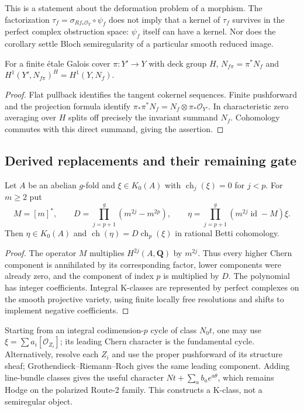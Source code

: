 This is a statement about the deformation problem of a morphism.
The factorization
$\tau_f=\sigma_{Rf_*\mathcal O_Y}\circ\psi_f$
does not imply that a kernel of $\tau_f$ survives in the perfect
complex obstruction space: $\psi_f$ itself can have a kernel.
Nor does the corollary settle Bloch semiregularity of a particular
smooth reduced image.

\begin{proposition}
\label{prop:semireg-cover-invariants}
For a finite \'etale Galois cover $\pi:Y'\to Y$ with deck group $H$,
$N_{f\pi}=\pi^*N_f$ and
$H^1(Y',N_{f\pi})^H=H^1(Y,N_f)$.
\end{proposition}
\begin{proof}
Flat pullback identifies the tangent cokernel sequences.
Finite pushforward and the projection formula identify
$\pi_*\pi^*N_f=N_f\otimes\pi_*\mathcal O_{Y'}$.
In characteristic zero averaging over $H$ splits off precisely
the invariant summand $N_f$. Cohomology commutes with this direct
summand, giving the assertion.
\end{proof}

\subsection{Derived replacements and their remaining gate}

\begin{proposition}
\label{prop:semireg-k-projector}
Let $A$ be an abelian $g$-fold and $\xi\in K_0(A)$ with
$\operatorname{ch}_j(\xi)=0$ for $j<p$. For $m\geq2$ put
\[
 M=[m]^*,\qquad
 D=\prod_{j=p+1}^g(m^{2j}-m^{2p}),\qquad
 \eta=\prod_{j=p+1}^g(m^{2j}\operatorname{id}-M)\xi.
\]
Then $\eta\in K_0(A)$ and
$\operatorname{ch}(\eta)=D\operatorname{ch}_p(\xi)$ in rational
Betti cohomology.
\end{proposition}
\begin{proof}
The operator $M$ multiplies $H^{2j}(A,\mathbf Q)$ by $m^{2j}$.
Thus every higher Chern component is annihilated by its corresponding
factor, lower components were already zero, and the component of
index $p$ is multiplied by $D$. The polynomial has integer
coefficients. Integral K-classes are represented by perfect complexes
on the smooth projective variety, using finite locally free
resolutions and shifts to implement negative coefficients.
\end{proof}

Starting from an integral codimension-$p$ cycle of class $N_0t$,
one may use $\xi=\sum a_i[\mathcal O_{Z_i}]$; its leading Chern
character is the fundamental cycle. Alternatively, resolve each
$Z_i$ and use the proper pushforward of its structure sheaf;
Grothendieck--Riemann--Roch gives the same leading component.
Adding line-bundle classes gives the useful character
$Nt+\sum_a b_a e^{a\theta}$, which remains Hodge on the polarized
Route-2 family. This constructs a K-class, not a semiregular object.

